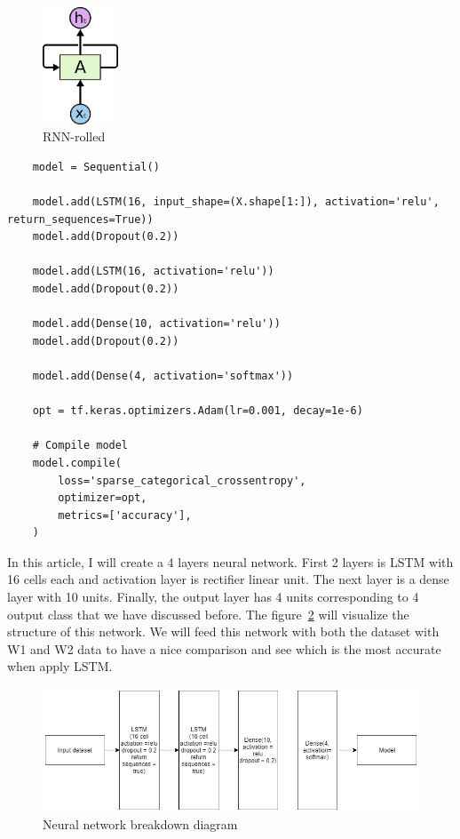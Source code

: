     \begin{figure}[h]
        \centering
        \includegraphics[width = 0.2\textwidth]{images/RNN-rolled.png}
        \caption{RNN-rolled}
        \label{fig:RNN}
    \end{figure}
    
        \begin{lstlisting}
    model = Sequential()

    model.add(LSTM(16, input_shape=(X.shape[1:]), activation='relu', return_sequences=True))
    model.add(Dropout(0.2))
    
    model.add(LSTM(16, activation='relu'))
    model.add(Dropout(0.2))
    
    model.add(Dense(10, activation='relu'))
    model.add(Dropout(0.2))
    
    model.add(Dense(4, activation='softmax'))
    
    opt = tf.keras.optimizers.Adam(lr=0.001, decay=1e-6)
    
    # Compile model
    model.compile(
        loss='sparse_categorical_crossentropy',
        optimizer=opt,
        metrics=['accuracy'],
    )
    \end{lstlisting}
    
    In this article, I will create a 4 layers neural network. First 2 layers is LSTM with 16 cells each and activation layer is rectifier linear unit. The next layer is a dense layer with 10 units. Finally, the output layer has 4 units corresponding to 4 output class that we have discussed before. The figure~\ref{fig:LSTMDiagram} will visualize the structure of this network. We will feed this network with both the dataset with W1 and W2 data to have a nice comparison and see which is the most accurate when apply LSTM.
    

    \begin{figure}[h]
        \centering
        \includegraphics[width = 1\textwidth]{images/LSTMDiagram.png}
        \caption{Neural network breakdown diagram}
        \label{fig:LSTMDiagram}
    \end{figure}
    
